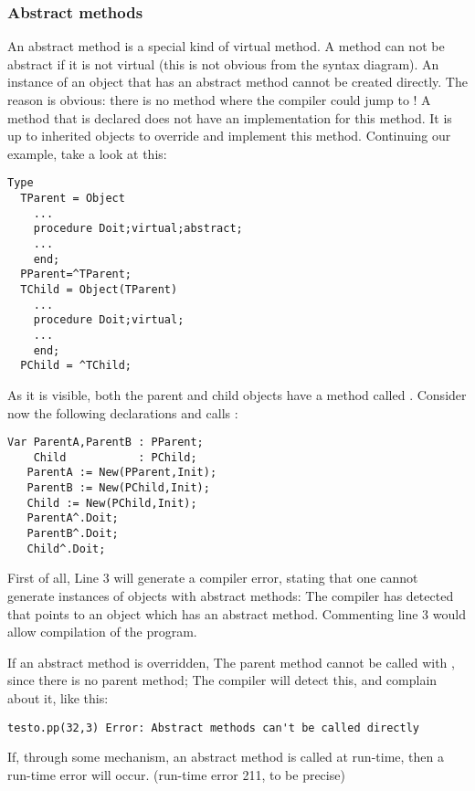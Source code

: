 \subsubsection{Abstract methods}
An abstract method is a special kind of virtual method. A method can not be
abstract if it is not virtual (this is not obvious from the syntax diagram).
An instance of an object that has an abstract method cannot be created directly.
The reason is obvious: there is no method where the compiler could jump to !
A method that is declared  does not have an implementation for
this method. It is up to inherited objects to override and implement this
method. Continuing our example, take a look at this:
\begin{verbatim}
Type
  TParent = Object
    ...
    procedure Doit;virtual;abstract;
    ...
    end;
  PParent=^TParent;
  TChild = Object(TParent)
    ...
    procedure Doit;virtual;
    ...
    end;
  PChild = ^TChild;
\end{verbatim}
As it is visible, both the parent and child objects have a method called
. Consider now the following declarations and calls :
\begin{verbatim}
Var ParentA,ParentB : PParent;
    Child           : PChild;
   ParentA := New(PParent,Init);
   ParentB := New(PChild,Init);
   Child := New(PChild,Init);
   ParentA^.Doit;
   ParentB^.Doit;
   Child^.Doit;
\end{verbatim}
First of all, Line 3 will generate a compiler error, stating that one cannot
generate instances of objects with abstract methods: The compiler has
detected that  points to an object which has an abstract
method. Commenting line 3 would allow compilation of the program.
\begin{remark}
If an abstract method is overridden, The parent method cannot be called
with , since there is no parent method; The compiler
will detect this, and complain about it, like this:
\begin{verbatim}
testo.pp(32,3) Error: Abstract methods can't be called directly
\end{verbatim}
If, through some mechanism, an abstract method is called at run-time,
then a run-time error will occur. (run-time error 211, to be precise)
\end{remark}

